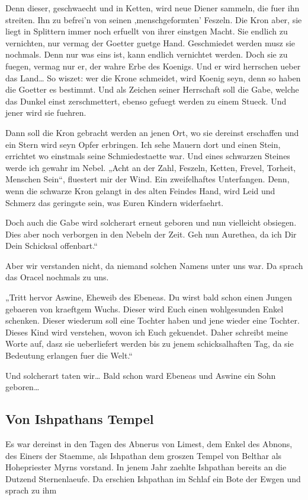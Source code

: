 \documentclass[a5paper,8pt]{book}
\begin{document}
Denn dieser, geschwaecht und in Ketten, wird neue Diener sammeln, die fuer ihn streiten. Ihn zu befrei’n von seinen ‚menschgeformten’ Feszeln.
Die Kron aber, sie liegt in Splittern immer noch erfuellt von ihrer einstgen Macht. Sie endlich zu vernichten, nur vermag der Goetter guetge Hand. Geschmiedet werden musz sie nochmals. Denn nur was eins ist, kann endlich vernichtet werden. Doch sie zu fuegen, vermag nur er, der wahre Erbe des Koenigs. Und er wird herrschen ueber das Land… So wiszet: wer die Krone schmeidet, wird Koenig seyn, denn so haben die Goetter es bestimmt. 
Und als Zeichen seiner Herrschaft soll die Gabe, welche das Dunkel einst zerschmettert, ebenso gefuegt werden zu einem Stueck. Und jener wird sie fuehren.

Dann soll die Kron gebracht werden an jenen Ort, wo sie dereinst erschaffen und ein Stern wird seyn Opfer erbringen. Ich sehe Mauern dort und einen Stein, errichtet wo einstmals seine Schmiedestaette war. Und eines schwarzen Steines werde ich gewahr im Nebel. „Acht an der Zahl, Feszeln, Ketten, Frevel, Torheit, Menschen Sein“, fluestert mir der Wind. Ein zweifelhaftes Unterfangen. Denn, wenn die schwarze Kron gelangt in des alten Feindes Hand, wird Leid und Schmerz das geringste sein, was Euren Kindern widerfaehrt.

Doch auch die Gabe wird solcherart erneut geboren und nun vielleicht obsiegen. Dies aber noch verborgen in den Nebeln der Zeit. Geh nun Aurethea, da ich Dir Dein Schicksal offenbart.“

Aber wir verstanden nicht, da niemand solchen Namens unter uns war. Da sprach das Oracel nochmals zu uns.

„Tritt hervor Aswine, Eheweib des Ebeneas. Du wirst bald schon einen Jungen gebaeren von kraeftgem Wuchs. Dieser wird Euch einen wohlgesunden Enkel schenken. Dieser wiederum soll eine Tochter haben und jene wieder eine Tochter. Dieses Kind wird verstehen, wovon ich Euch gekuendet. Daher schreibt meine Worte auf, dasz sie ueberliefert werden bis zu jenem schicksalhaften Tag, da sie Bedeutung erlangen fuer die Welt.“

Und solcherart taten wir… Bald schon ward Ebeneas und Aswine ein Sohn geboren…
\newpage
\subsection{ Von Ishpathans Tempel}

Es war dereinst in den Tagen des Abnerus von Limest, dem Enkel des Abnons, des Einers der Staemme, als  Ishpathan dem groszen Tempel von Belthar als Hohepriester Myrns vorstand. In jenem Jahr zaehlte Ishpathan bereits an die Dutzend Sternenlaeufe.
Da erschien Ishpathan im Schlaf ein Bote der Ewgen und sprach zu ihm
\end{document}
